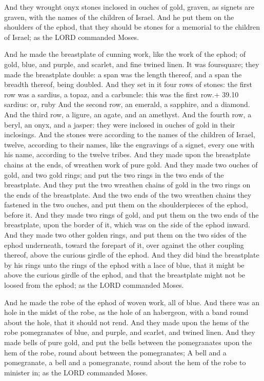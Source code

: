  And they wrought onyx stones inclosed in ouches of gold,
graven, as signets are graven, with the names of the children of Israel.
 And he put them on the shoulders of the ephod, that they
should be stones for a memorial to the children of Israel; as the LORD
commanded Moses.

 And he made the breastplate of cunning work, like the
work of the ephod; of gold, blue, and purple, and scarlet, and fine
twined linen.  It was foursquare; they made the breastplate
double: a span was the length thereof, and a span the breadth thereof,
being doubled.  And they set in it four rows of stones: the
first row was a sardius, a topaz, and a carbuncle: this was the first
row.+ 39.10 sardius: or, ruby  And the second row, an
emerald, a sapphire, and a diamond.  And the third row, a
ligure, an agate, and an amethyst.  And the fourth row, a
beryl, an onyx, and a jasper: they were inclosed in ouches of gold in
their inclosings.  And the stones were according to the
names of the children of Israel, twelve, according to their names, like
the engravings of a signet, every one with his name, according to the
twelve tribes.  And they made upon the breastplate chains
at the ends, of wreathen work of pure gold.  And they made
two ouches of gold, and two gold rings; and put the two rings in the two
ends of the breastplate.  And they put the two wreathen
chains of gold in the two rings on the ends of the breastplate.
 And the two ends of the two wreathen chains they fastened
in the two ouches, and put them on the shoulderpieces of the ephod,
before it.  And they made two rings of gold, and put them
on the two ends of the breastplate, upon the border of it, which was on
the side of the ephod inward.  And they made two other
golden rings, and put them on the two sides of the ephod underneath,
toward the forepart of it, over against the other coupling thereof,
above the curious girdle of the ephod.  And they did bind
the breastplate by his rings unto the rings of the ephod with a lace of
blue, that it might be above the curious girdle of the ephod, and that
the breastplate might not be loosed from the ephod; as the LORD
commanded Moses.

 And he made the robe of the ephod of woven work, all of
blue.  And there was an hole in the midst of the robe, as
the hole of an habergeon, with a band round about the hole, that it
should not rend.  And they made upon the hems of the robe
pomegranates of blue, and purple, and scarlet, and twined linen.
 And they made bells of pure gold, and put the bells
between the pomegranates upon the hem of the robe, round about between
the pomegranates;  A bell and a pomegranate, a bell and a
pomegranate, round about the hem of the robe to minister in; as the LORD
commanded Moses.

